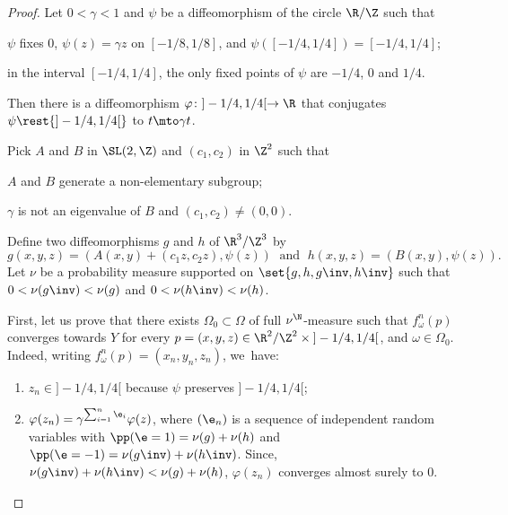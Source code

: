 \begin{proof}

Let $0<\gamma<1$ and $\psi$ be a diffeomorphism of the circle $\R/\Z$ such that
\begin{enumeratei}
\item\label{hyp:i} $\psi$ fixes $0$, $\psi(z)=\gamma z$ on $[-1/8,1/8]$, and $\psi([-1/4,1/4]) = [-1/4,1/4]$;
\item\label{hyp:ii} in the interval $[-1/4, 1/4]$, the only fixed points of $\psi$ are $-1/4$, $0$ and $1/4$.
\end{enumeratei}
Then there is a diffeomorphism $\varphi\colon ]-1/4,1/4[\to \R$ that conjugates $\psi\rest{ ]-1/4,1/4[}$ to $t\mto \gamma t$.

Pick $A$ and $ B$ in $ \SL(2, \Z)$ and $(c_1,c_2)$ in $\Z^2$ such that
\begin{enumeratei}\setcounter{enumi}{2}
\item\label{hyp:iii}
$A$ and $B$ generate a non-elementary subgroup;
\item\label{hyp:iv}
$\gamma$ is not an eigenvalue of $B$
and $(c_1,c_2)\neq (0,0)$.
\end{enumeratei}
Define two diffeomorphisms $g$ and $h$ of $\R^3/\Z^3$ by
\begin{equation*}
g(x,y,z) = (A(x,y)+(c_1z, c_2z), \psi(z))\; \text{ and } \; h(x,y,z) = (B(x,y), \psi(z)).
\end{equation*}
Let $\nu$ be a probability measure supported on $\set{g, h, g\inv, h\inv}$ such that
$0<\nu(g\inv)<\nu(g)$ and $0<\nu(h\inv)<\nu(h)$.

First, let us prove that there exists $\Omega_0\subset \Omega$ of full
$\nu^\N$-measure such that $f_\omega^n(p)$ converges towards $Y$ for every $p = (x,y,z)\in \R^2/\Z^2 \times{}]-1/4, 1/4[$,
and $\omega\in \Omega_0$. Indeed, writing $f_\omega^n(p) = (x_n, y_n, z_n)$, we~have:
\begin{enumerate}
\item $z_n\in{} ]-1/4, 1/4[$ because $\psi$ preserves $]-1/4, 1/4[$;
\item $\varphi(z_n ) = \gamma^{\sum_{i=1}^{n} \e_i} \varphi(z)$, where
$(\e_n)$ is a sequence of independent random variables with
$\pp(\e =1 ) = \nu(g)+\nu(h)$ and $\pp(\e =-1 ) = \nu(g\inv)+\nu(h\inv)$. Since, $\nu(g\inv)+\nu(h\inv)< \nu(g)+\nu(h)$, $\varphi(z_n)$ converges almost surely to $0$.
\end{enumerate}


\end{proof}
